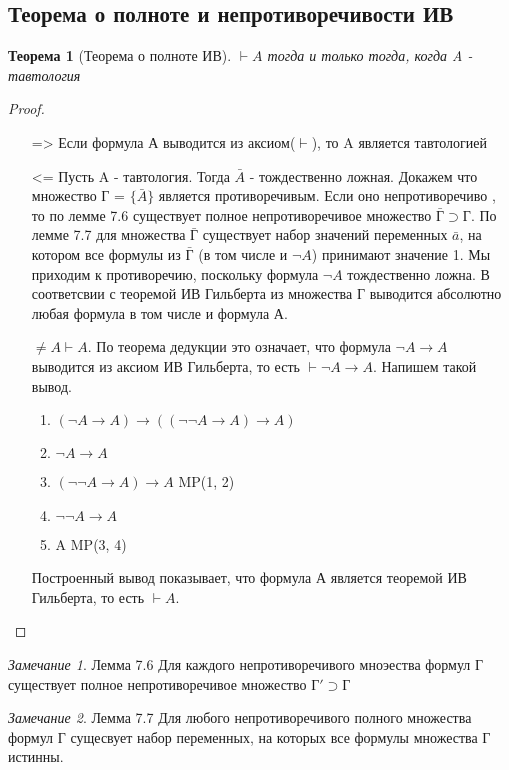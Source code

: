 \documentclass[a4paper]{article}
\newtheorem{theorem}{Теорема}[section]
\theoremstyle{definition}
\theoremstyle{remark}
\newtheorem*{remark}{Замечание}
\begin{document}
    \subsection{Теорема о полноте и непротиворечивости ИВ}
	\begin{theorem}[Теорема о полноте ИВ]
		$\vdash A$ тогда и только тогда, когда A - тавтология
	\end{theorem}
	\begin{proof}
        \begin{itemize}
            ;;
            \item[=>] Если формула А выводится из аксиом($\vdash$), то A является тавтологией
            \item[<=] Пусть A - тавтология. Тогда $\bar{A}$ - тождественно ложная. Докажем что множество Г = $\{\bar{A}\}$ является противоречивым. Если оно непротиворечиво , то по лемме 7.6 существует полное непротиворечивое множество $\bar{Г} \supset Г$. По лемме 7.7 для множества $\bar{Г}$ существует набор значений переменных $\bar{a}$, на котором все формулы из $\bar{Г}$ (в том числе и $\neg A$) принимают значение 1. Мы приходим к противоречию, поскольку формула $\neg A$ тождественно ложна. В соответсвии с теоремой ИВ Гильберта из множества Г выводится абсолютно любая формула в том числе и формула А.

            $\neq A \vdash A$. По теорема дедукции это означает, что формула $\neg A \rightarrow A$ выводится из аксиом ИВ Гильберта, то есть $\vdash \neg A \rightarrow A$. Напишем такой вывод.
            \begin{enumerate}
                \item $(\neg A \rightarrow A) \rightarrow ((\neg\neg A \rightarrow A) \rightarrow A)$
                \item $\neg A \rightarrow A$
                \item $(\neg\neg A \rightarrow A) \rightarrow A$ MP(1, 2)
                \item $\neg\neg A \rightarrow A$
                \item A MP(3, 4)
            \end{enumerate}
    
            Построенный вывод показывает, что формула А является теоремой ИВ Гильберта, то есть $\vdash A$. 
       
        \end{itemize}
		 \end{proof}
	\begin{remark}
		Лемма 7.6 Для каждого непротиворечивого мноэества формул Г существует полное непротиворечивое множество $Г' \supset Г$
	\end{remark}
	\begin{remark}
		Лемма 7.7 Для любого непротиворечивого полного множества формул Г сущесвует набор переменных, на которых все формулы множества Г истинны.
	\end{remark}
\end{document}
